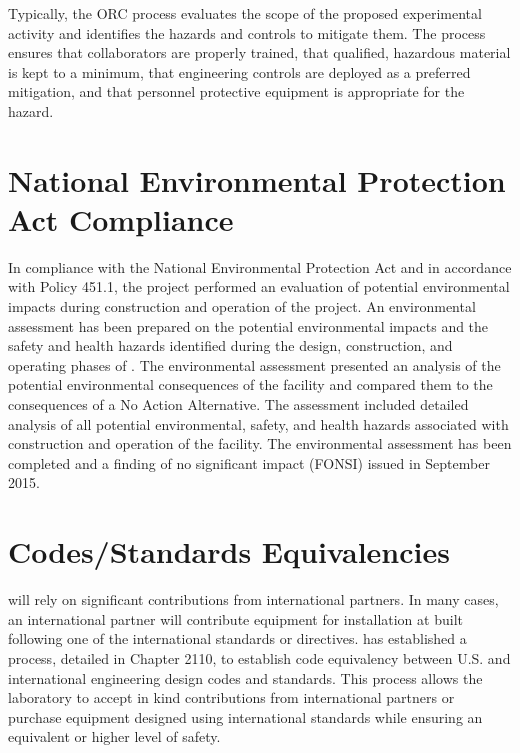 Typically, the ORC process evaluates the scope of the proposed
experimental activity and identifies the hazards and controls to
mitigate them. The process ensures that collaborators are properly
trained, that qualified, hazardous material is kept to a minimum, that
engineering controls are deployed as a preferred mitigation, and that
personnel protective equipment is appropriate for the hazard.

\section{National Environmental Protection Act Compliance}

In compliance with the National Environmental Protection Act and in
accordance with  Policy 451.1, the
 project performed an evaluation of potential
environmental impacts during construction and operation of the
project.  An environmental assessment has been prepared on the
potential environmental impacts and the safety and health hazards
identified during the design, construction, and operating phases of
.  The environmental assessment presented an
analysis of the potential environmental consequences of the facility
and compared them to the consequences of a No Action Alternative. The
assessment included detailed analysis of all potential environmental,
safety, and health hazards associated with construction and operation
of the facility.  The environmental assessment has been completed and
a finding of no significant impact (FONSI) issued in September 2015.

\section{Codes/Standards Equivalencies}
\label{sec:esh_codes}

 will rely on significant contributions from international
partners. In many cases, an international partner will contribute
equipment for installation at \fnal built following one of the
international standards or directives. \fnal has established a
process, detailed in  Chapter 2110, to establish code
equivalency between U.S. and international engineering design codes
and standards. This process allows the laboratory to accept in kind
contributions from international partners or purchase equipment
designed using international standards while ensuring an equivalent or
higher level of safety.

